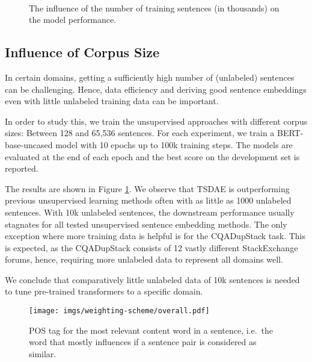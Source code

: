 \documentclass[11pt,a4paper]{article}
\begin{document}
\begin{figure}[t]
  \centering
   \\
  \caption{The influence of the number of training sentences (in thousands) on the model performance.}
  \label{fig:training_size}
\end{figure}

\subsection{Influence of Corpus Size} 
In certain domains, getting a sufficiently high number of (unlabeled) sentences can be challenging. Hence, data efficiency and deriving good sentence embeddings even with little unlabeled training data can be important. 

In order to study this, we train the unsupervised approaches with different corpus sizes: Between 128 and 65,536 sentences. For each experiment, we train a BERT-base-uncased model with 10 epochs up to 100k training steps. The models are evaluated at the end of each epoch and the best score on the development set is reported. 

The results are shown in Figure \ref{fig:training_size}. We observe that TSDAE is outperforming previous unsupervised learning methods often with as little as 1000 unlabeled sentences. With 10k unlabeled sentences, the downstream performance usually stagnates for all tested unsupervised sentence embedding methods. The only exception where more training data is helpful is for the CQADupStack task. This is expected, as the CQADupStack consists of 12 vastly different StackExchange forums, hence, requiring more unlabeled data to represent all domains well.

We conclude that comparatively little unlabeled data of 10k sentences is needed to tune pre-trained transformers to a specific domain.


\begin{figure}[t]
  \centering
  \texttt{[image: imgs/weighting-scheme/overall.pdf]}
  \caption{POS tag for the most relevant content word in a sentence, i.e.\ the word that mostly influences if a sentence pair is considered as similar.}
  \label{fig:weighting_scheme_top1_overall}
\end{figure}
\end{document}
